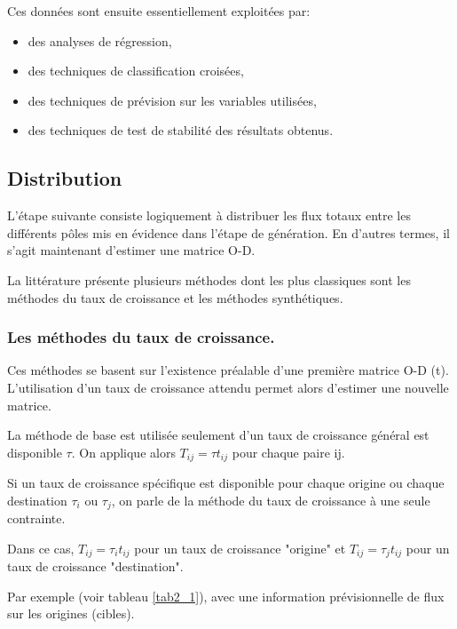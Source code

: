 Ces données sont ensuite essentiellement exploitées par:

\begin{itemize}
\item des analyses de régression,
\item des techniques de classification croisées,
\item des techniques de prévision sur les variables utilisées,
\item des techniques de test de stabilité des résultats obtenus.
\end{itemize}

\subsection{Distribution}

L'étape suivante consiste logiquement à distribuer les flux totaux
entre les différents pôles mis en évidence dans l'étape de
génération. En d'autres termes, il s'agit maintenant d'estimer une
matrice O-D.

La littérature présente plusieurs méthodes dont les plus classiques sont les
méthodes du taux de croissance et les méthodes synthétiques.

\subsubsection{Les méthodes du taux de croissance.}

Ces méthodes se basent sur l'existence préalable d'une première
matrice O-D (t). L'utilisation d'un taux de croissance attendu
permet alors d'estimer une nouvelle matrice.

La méthode de base est utilisée seulement d'un taux de croissance
général est disponible  $\tau$. On applique alors $T_{ij} = \tau
t_{ij}$ pour chaque paire ij.

Si un taux de croissance spécifique est disponible pour chaque
origine ou chaque destination $\tau_i$ ou $\tau_j$, on parle de la
méthode du taux de croissance à une seule contrainte.

Dans ce cas, $T_{ij} = \tau_it_{ij}$ pour un taux de croissance
"origine" et $T_{ij} = \tau _jt_{ij}$ pour un taux de croissance
"destination".

Par exemple (voir tableau \ref{tab2_1}), avec une information prévisionnelle de
flux sur les origines (cibles).

